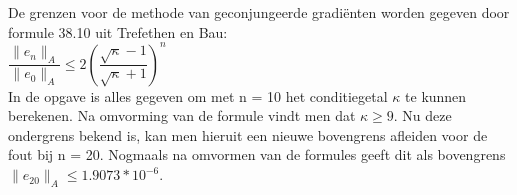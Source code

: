 De grenzen voor de methode van geconjungeerde gradi\"enten worden gegeven door formule 38.10 uit Trefethen en Bau:\\[12pt]

$\dfrac{\|e_{n}\|_{A}}{\|e_{0}\|_{A}} \leq 2(\dfrac{\sqrt{\kappa} - 1}{\sqrt{\kappa} + 1})^{n}$\\[12pt]

In de opgave is alles gegeven om met n = 10 het conditiegetal $\kappa$ te kunnen berekenen. Na omvorming van de formule vindt men dat $\kappa \geq 9$.
Nu deze ondergrens bekend is, kan men hieruit een nieuwe bovengrens afleiden voor de fout bij n = 20. Nogmaals na omvormen van de formules geeft dit als bovengrens $\|e_{20}\|_{A} \leq 1.9073*10^{-6}$.\\
